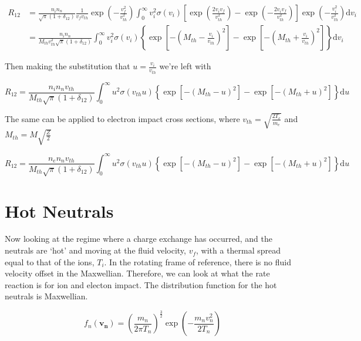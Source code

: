 \documentclass[11pt]{article}
\begin{document}
\begin{align}
	R_{12} &= \frac{n_i n_n}{\sqrt{\pi} (1 + \delta_{12})} \frac{1}{v_f v_{th}} \exp \left( -\frac{v_f^2}{v_{th}^2} \right)  \int_0^\infty v_i^2 \sigma(v_i) \left[ \exp \left( \frac{2 v_i v_f}{v_{th}^2} \right) - \exp \left( -\frac{2 v_i v_f}{v_{th}^2} \right) \right] \exp \left( -\frac{v_i^2}{v_{th}^2} \right) \mathrm{d} v_i\\
	&= \frac{n_i n_n}{M_{th} v_{th}^2 \sqrt{\pi} (1 + \delta_{12})} \int_0^\infty v_i^2 \sigma(v_i) \left\lbrace \exp \left[ -\left( M_{th} - \frac{v_i}{v_{th}} \right)^2 \right] - \exp \left[ -\left( M_{th} + \frac{v_i}{v_{th}} \right)^2 \right] \right\rbrace \mathrm{d} v_i
\end{align}

Then making the substitution that $u = \frac{v_i}{v_{th}}$ we're left with
	
\begin{equation}
	R_{12} = \frac{n_i n_n v_{th}}{M_{th} \sqrt{\pi} (1 + \delta_{12})} \int_0^\infty u^2 \sigma(v_{th} u) \left\lbrace \exp \left[ -\left( M_{th} -  u \right)^2 \right] - \exp \left[ -\left( M_{th} + u \right)^2 \right] \right\rbrace \mathrm{d} u
\end{equation}

The same can be applied to electron impact cross sections, where $v_{th} = \sqrt{\frac{2 T_e}{m_e}}$ and $M_{th} = M \sqrt{\frac{Z}{2}}$

\begin{equation}
	R_{12} = \frac{n_e n_n v_{th}}{M_{th} \sqrt{\pi} (1 + \delta_{12})} \int_0^\infty u^2 \sigma(v_{th} u) \left\lbrace \exp \left[ -\left( M_{th} -  u \right)^2 \right] - \exp \left[ -\left( M_{th} + u \right)^2 \right] \right\rbrace \mathrm{d} u
\end{equation}

\section{Hot Neutrals}

Now looking at the regime where a charge exchange has occurred, and the neutrals are `hot' and moving at the fluid velocity, $v_f$, with a thermal spread equal to that of the ions, $T_i$. In the rotating frame of reference, there is no fluid velocity offset in the Maxwellian. Therefore, we can look at what the rate reaction is for ion and electon impact. The distribution function for the hot neutrals is Maxwellian.

\begin{equation}
	f_n(\mathbf{v_n}) = \left( \frac{m_n}{2 \pi T_n} \right)^{\frac{3}{2}} \exp \left( -\frac{m_n v_n^2}{2 T_n} \right)  
\end{equation}
\end{document}
